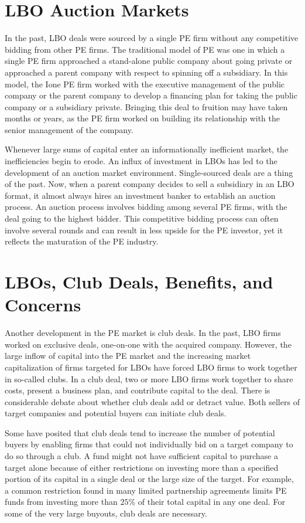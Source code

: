 \documentclass[11pt]{article}
\begin{document}
\section*{LBO Auction Markets}
In the past, LBO deals were sourced by a single PE firm without any competitive bidding from other PE firms. The traditional model of PE was one in which a single PE firm approached a stand-alone public company about going private or approached a parent company with respect to spinning off a subsidiary. In this model, the Ione PE firm worked with the executive management of the public company or the parent company to develop a financing plan for taking the public company or a subsidiary private. Bringing this deal to fruition may have taken months or years, as the PE firm worked on building its relationship with the senior management of the company.

Whenever large sums of capital enter an informationally inefficient market, the inefficiencies begin to erode. An influx of investment in LBOs has led to the development of an auction market environment. Single-sourced deals are a thing of the past. Now, when a parent company decides to sell a subsidiary in an LBO format, it almost always hires an investment banker to establish an auction process. An auction process involves bidding among several PE firms, with the deal going to the highest bidder. This competitive bidding process can often involve several rounds and can result in less upside for the PE investor, yet it reflects the maturation of the PE industry.

\section*{LBOs, Club Deals, Benefits, and Concerns}
Another development in the PE market is club deals. In the past, LBO firms worked on exclusive deals, one-on-one with the acquired company. However, the large inflow of capital into the PE market and the increasing market capitalization of firms targeted for LBOs have forced LBO firms to work together in so-called clubs. In a club deal, two or more LBO firms work together to share costs, present a business plan, and contribute capital to the deal. There is considerable debate about whether club deals add or detract value. Both sellers of target companies and potential buyers can initiate club deals.

Some have posited that club deals tend to increase the number of potential buyers by enabling firms that could not individually bid on a target company to do so through a club. A fund might not have sufficient capital to purchase a target alone because of either restrictions on investing more than a specified portion of its capital in a single deal or the large size of the target. For example, a common restriction found in many limited partnership agreements limits PE funds from investing more than $25 \%$ of their total capital in any one deal. For some of the very large buyouts, club deals are necessary.
\end{document}
